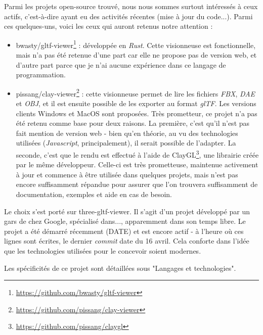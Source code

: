 
Parmi les projets open-source trouvé, nous nous sommes surtout intéressés à ceux actifs, c'est-à-dire ayant eu des activités récentes (mise à jour du code...). Parmi ces quelques-uns, voici les ceux qui auront retenus notre attention :

\begin{itemize}
    \item bwasty/gltf-viewer\footnote{\url{https://github.com/bwasty/gltf-viewer}} : développée en \textit{Rust}. Cette visionneuse est fonctionnelle, mais n'a pas été retenue d'une part car elle ne propose pas de version web, et d'autre part parce que je n'ai aucune expérience dans ce langage de programmation.
    \item pissang/clay-viewer\footnote{\url{https://github.com/pissang/clay-viewer}} : cette visionneuse permet de lire les fichiers \textit{FBX}, \textit{DAE} et \textit{OBJ}, et il est ensuite possible de les exporter au format \textit{glTF}. Les versions clients Windows et MacOS sont proposées. Très prometteur, ce projet n'a pas été retenu comme base pour deux raisons. La première, c'est qu'il n'est pas fait mention de version web - bien qu'en théorie, au vu des technologies utilisées (\textit{Javascript}, principalement), il serait possible de l'adapter. La seconde, c'est que le rendu est effectué à l'aide de ClayGL\footnote{\url{https://github.com/pissang/claygl}}, une librairie créée par le même développeur. Celle-ci est très prometteuse, maintenue activement à jour et commence à être utilisée dans quelques projets, mais n'est pas encore suffisamment répandue pour assurer que l'on trouvera suffisamment de documentation, exemples et aide en cas de besoin.
\end{itemize}


Le choix s'est porté sur three-gltf-viewer.
Il s'agit d'un projet développé par un gars de chez Google, spécialisé dans...,  apparemment dans son temps libre.
Le projet a été démarré récemment (DATE) et est encore actif - à l'heure où ces lignes sont écrites, le dernier \textit{commit} date du 16 avril. Cela conforte dans l'idée que les technologies utilisées pour le concevoir soient modernes.

Les spécificités de ce projet sont détaillées sous "Langages et technologies".


